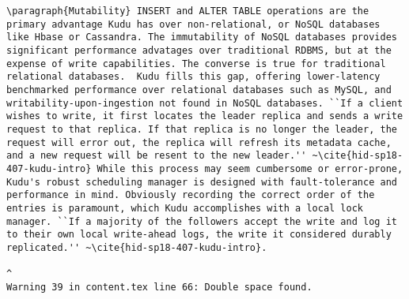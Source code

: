 \begin{tiny}
\begin{verbatim}
\paragraph{Mutability} INSERT and ALTER TABLE operations are the primary advantage Kudu has over non-relational, or NoSQL databases like Hbase or Cassandra. The immutability of NoSQL databases provides significant performance advatages over traditional RDBMS, but at the expense of write capabilities. The converse is true for traditional relational databases.  Kudu fills this gap, offering lower-latency benchmarked performance over relational databases such as MySQL, and writability-upon-ingestion not found in NoSQL databases. ``If a client wishes to write, it first locates the leader replica and sends a write request to that replica. If that replica is no longer the leader, the request will error out, the replica will refresh its metadata cache, and a new request will be resent to the new leader.'' ~\cite{hid-sp18-407-kudu-intro} While this process may seem cumbersome or error-prone, Kudu's robust scheduling manager is designed with fault-tolerance and performance in mind. Obviously recording the correct order of the entries is paramount, which Kudu accomplishes with a local lock manager. ``If a majority of the followers accept the write and log it to their own local write-ahead logs, the write it considered durably replicated.'' ~\cite{hid-sp18-407-kudu-intro}.  
                                                                                                                                                                                                                                                                                                                                                                                                                                                                                                                                                                                                                                                                                                                                                                                                                                         ^
Warning 39 in content.tex line 66: Double space found.

\end{verbatim}
\end{tiny}

